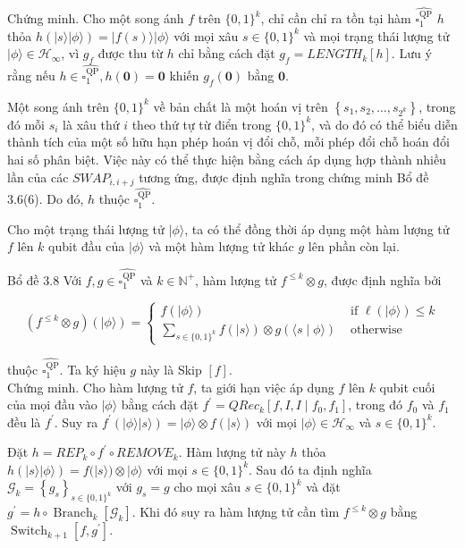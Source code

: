\documentclass[10pt]{article}
\begin{document}
Chứng minh. Cho một song ánh $f$ trên $\{0,1\}^{k}$, chỉ cần chỉ ra tồn tại hàm $\widehat{\square_{1}^{\mathrm{QP}}}$ $h$ thỏa $h(|s\rangle|\phi\rangle)=|f(s)\rangle|\phi\rangle$ với mọi xâu $s \in\{0,1\}^{k}$ và mọi trạng thái lượng tử $|\phi\rangle \in \mathcal{H}_{\infty}$, vì $g_{f}$ được thu từ $h$ chỉ bằng cách đặt $g_{f}=L E N G T H_{k}[h]$. Lưu ý rằng nếu $h \in \widehat{\square_{1}^{\mathrm{QP}}}, h(\mathbf{0})=\mathbf{0}$ khiến $g_{f}(\mathbf{0})$ bằng $\mathbf{0}$.

Một song ánh trên $\{0,1\}^{k}$ về bản chất là một hoán vị trên $\left\{s_{1}, s_{2}, \ldots, s_{2^{k}}\right\}$, trong đó mỗi $s_{i}$ là xâu thứ $i$ theo thứ tự từ điển trong $\{0,1\}^{k}$, và do đó có thể biểu diễn thành tích của một số hữu hạn phép hoán vị đổi chỗ, mỗi phép đổi chỗ hoán đổi hai số phân biệt. Việc này có thể thực hiện bằng cách áp dụng hợp thành nhiều lần của các $S W A P_{i, i+j}$ tương ứng, được định nghĩa trong chứng minh Bổ đề 3.6(6). Do đó, $h$ thuộc $\widehat{\square_{1}^{\mathrm{QP}}}$.

Cho một trạng thái lượng tử $|\phi\rangle$, ta có thể đồng thời áp dụng một hàm lượng tử $f$ lên $k$ qubit đầu của $|\phi\rangle$ và một hàm lượng tử khác $g$ lên phần còn lại.

Bổ đề 3.8 Với $f, g \in \widehat{\square_{1}^{\mathrm{QP}}}$ và $k \in \mathbb{N}^{+}$, hàm lượng tử $f^{\leq k} \otimes g$, được định nghĩa bởi

$$
\left(f^{\leq k} \otimes g\right)(|\phi\rangle)= \begin{cases}f(|\phi\rangle) & \text { if } \ell(|\phi\rangle) \leq k \\ \sum_{s \in\{0,1\}^{k}} f(|s\rangle) \otimes g(\langle s \mid \phi\rangle) & \text { otherwise }\end{cases}
$$

thuộc $\widehat{\square_{1}^{\mathrm{QP}}}$. Ta ký hiệu $g$ này là Skip $[f]$.\\
Chứng minh. Cho hàm lượng tử $f$, ta giới hạn việc áp dụng $f$ lên $k$ qubit cuối của mọi đầu vào $|\phi\rangle$ bằng cách đặt $f^{\prime}=Q R e c_{k}\left[f, I, I \mid f_{0}, f_{1}\right]$, trong đó $f_{0}$ và $f_{1}$ đều là $f^{\prime}$. Suy ra $f^{\prime}(|\phi\rangle|s\rangle)=|\phi\rangle \otimes f(|s\rangle)$ với mọi $|\phi\rangle \in \mathcal{H}_{\infty}$ và $s \in\{0,1\}^{k}$.

Đặt $h=R E P_{k} \circ f^{\prime} \circ R E M O V E_{k}$. Hàm lượng tử này $h$ thỏa $h(|s\rangle|\phi\rangle)=f(|s\rangle) \otimes|\phi\rangle$ với mọi $s \in\{0,1\}^{k}$. Sau đó ta định nghĩa $\mathcal{G}_{k}=\left\{g_{s}\right\}_{s \in\{0,1\}^{k}}$ với $g_{s}=g$ cho mọi xâu $s \in\{0,1\}^{k}$ và đặt $g^{\prime}=h \circ \operatorname{Branch}_{k}\left[\mathcal{G}_{k}\right]$. Khi đó suy ra hàm lượng tử cần tìm $f^{\leq k} \otimes g$ bằng $\operatorname{Switch}_{k+1}\left[f, g^{\prime}\right]$.
\end{document}
